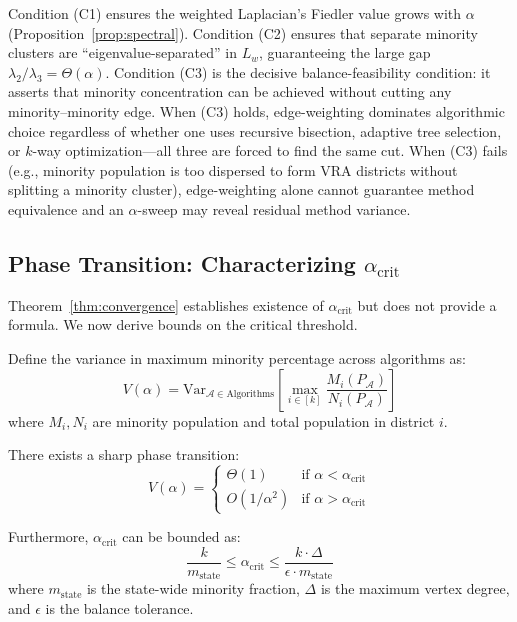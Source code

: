 \begin{remark}
\label{rem:conditions}
Condition (C1) ensures the weighted Laplacian's Fiedler value grows with $\alpha$ (Proposition~\ref{prop:spectral}). Condition (C2) ensures that separate minority clusters are ``eigenvalue-separated'' in $L_w$, guaranteeing the large gap $\lambda_2/\lambda_3 = \Theta(\alpha)$. Condition (C3) is the decisive balance-feasibility condition: it asserts that minority concentration can be achieved without cutting any minority--minority edge. When (C3) holds, edge-weighting dominates algorithmic choice regardless of whether one uses recursive bisection, adaptive tree selection, or $k$-way optimization---all three are forced to find the same cut. When (C3) fails (e.g., minority population is too dispersed to form VRA districts without splitting a minority cluster), edge-weighting alone cannot guarantee method equivalence and an $\alpha$-sweep may reveal residual method variance.
\end{remark}

\subsection{Phase Transition: Characterizing $\alpha_{\text{crit}}$}

Theorem~\ref{thm:convergence} establishes existence of $\alpha_{\text{crit}}$ but does not provide a formula. We now derive bounds on the critical threshold.

\begin{theorem}
\label{thm:phase-transition}
Define the variance in maximum minority percentage across algorithms as:
\[
V(\alpha) = \text{Var}_{\mathcal{A} \in \text{Algorithms}} \left[ \max_{i \in [k]} \frac{M_i(P_{\mathcal{A}})}{N_i(P_{\mathcal{A}})} \right]
\]
where $M_i, N_i$ are minority population and total population in district $i$.

There exists a sharp phase transition:
\[
V(\alpha) = \begin{cases}
\Theta(1) & \text{if } \alpha < \alpha_{\text{crit}} \\
O(1/\alpha^2) & \text{if } \alpha > \alpha_{\text{crit}}
\end{cases}
\]

Furthermore, $\alpha_{\text{crit}}$ can be bounded as:
\[
\frac{k}{m_{\text{state}}} \leq \alpha_{\text{crit}} \leq \frac{k \cdot \Delta}{\epsilon \cdot m_{\text{state}}}
\]
where $m_{\text{state}}$ is the state-wide minority fraction, $\Delta$ is the maximum vertex degree, and $\epsilon$ is the balance tolerance.
\end{theorem}

